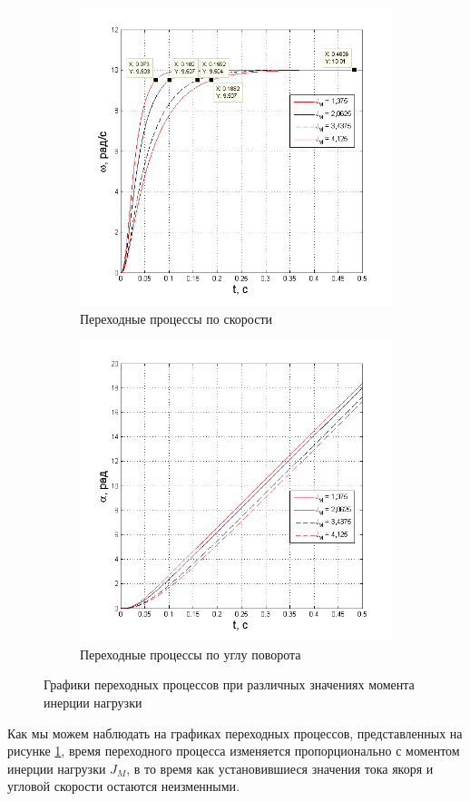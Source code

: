 \documentclass[fleqn, a4paper, 11pt, russian]{article}
\begin{document}
	\begin{figure}[ht!]\ContinuedFloat
		\centering
		\begin{subfigure}[b]{0.48\textwidth}
			\includegraphics[width = \textwidth]{JvarOmega}
			\caption{Переходные процессы по скорости}
		\end{subfigure}
		\hfill
		\begin{subfigure}[b]{0.48\textwidth}
			\includegraphics[width = \textwidth]{JvarAlpha}
			\caption{Переходные процессы по углу поворота}
		\end{subfigure}
		\caption{Графики переходных процессов при различных значениях момента инерции нагрузки}
		\label{JVar}
	\end{figure}
	Как мы можем наблюдать на графиках переходных процессов, представленных на рисунке \ref{JVar}, время переходного процесса изменяется пропорционально с моментом инерции нагрузки $J_M$, в то время как установившиеся значения тока якоря и угловой скорости остаются неизменными.
	\clearpage
\end{document}
